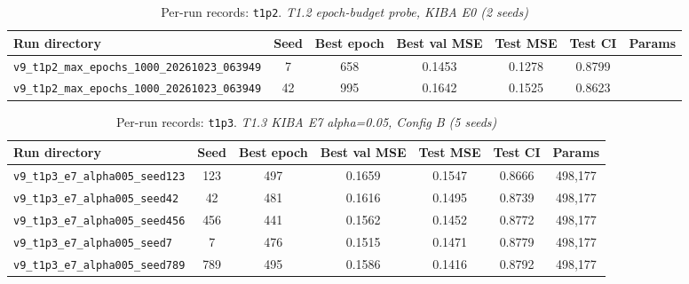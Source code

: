 \begin{table}[!h]
\centering\scriptsize
\caption{Per-run records: \texttt{t1p2}. \textit{T1.2 epoch-budget probe, KIBA E0 (2 seeds)}}
\label{tab:v9_runs_t1p2}
\begin{tabular}{p{4.8cm}cccccc}
\toprule
Run directory & Seed & Best epoch & Best val MSE & Test MSE & Test CI & Params \\
\midrule
\texttt{v9\_\allowbreak{}t1p2\_\allowbreak{}max\_\allowbreak{}epochs\_\allowbreak{}1000\_\allowbreak{}20261023\_\allowbreak{}063949} & 7 & 658 & 0.1453 & 0.1278 & 0.8799 &  \\
\texttt{v9\_\allowbreak{}t1p2\_\allowbreak{}max\_\allowbreak{}epochs\_\allowbreak{}1000\_\allowbreak{}20261023\_\allowbreak{}063949} & 42 & 995 & 0.1642 & 0.1525 & 0.8623 &  \\
\bottomrule
\end{tabular}
\end{table}

\begin{table}[!h]
\centering\scriptsize
\caption{Per-run records: \texttt{t1p3}. \textit{T1.3 KIBA E7 alpha=0.05, Config B (5 seeds)}}
\label{tab:v9_runs_t1p3}
\begin{tabular}{p{4.8cm}cccccc}
\toprule
Run directory & Seed & Best epoch & Best val MSE & Test MSE & Test CI & Params \\
\midrule
\texttt{v9\_\allowbreak{}t1p3\_\allowbreak{}e7\_\allowbreak{}alpha005\_\allowbreak{}seed123} & 123 & 497 & 0.1659 & 0.1547 & 0.8666 & 498,177 \\
\texttt{v9\_\allowbreak{}t1p3\_\allowbreak{}e7\_\allowbreak{}alpha005\_\allowbreak{}seed42} & 42 & 481 & 0.1616 & 0.1495 & 0.8739 & 498,177 \\
\texttt{v9\_\allowbreak{}t1p3\_\allowbreak{}e7\_\allowbreak{}alpha005\_\allowbreak{}seed456} & 456 & 441 & 0.1562 & 0.1452 & 0.8772 & 498,177 \\
\texttt{v9\_\allowbreak{}t1p3\_\allowbreak{}e7\_\allowbreak{}alpha005\_\allowbreak{}seed7} & 7 & 476 & 0.1515 & 0.1471 & 0.8779 & 498,177 \\
\texttt{v9\_\allowbreak{}t1p3\_\allowbreak{}e7\_\allowbreak{}alpha005\_\allowbreak{}seed789} & 789 & 495 & 0.1586 & 0.1416 & 0.8792 & 498,177 \\
\bottomrule
\end{tabular}
\end{table}

